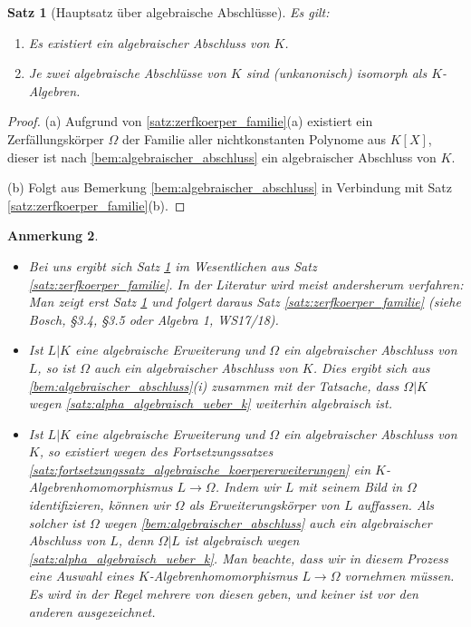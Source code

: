 \documentclass[a4paper, twoside, 11pt, ngerman]{report}
\theoremstyle{definistyle}
\newtheorem{satz}{Satz}[section]
\newtheorem{anm}[satz]{Anmerkung}
\theoremstyle{remark}
\begin{document}
\begin{satz}[Hauptsatz über algebraische Abschlüsse]\label{satz:hauptsatz_alg_abschluesse}
Es gilt:
\begin{enumerate}[label=(\alph*)]
\item Es existiert ein algebraischer Abschluss von $K$.
\item Je zwei algebraische Abschlüsse von $K$ sind (unkanonisch) isomorph als $K$-Algebren.
\end{enumerate}
\end{satz}

\begin{proof}
(a) Aufgrund von \ref{satz:zerfkoerper_familie}(a) existiert ein Zerfällungskörper $\Omega$ der Familie aller nichtkonstanten Polynome aus $K[X]$, dieser ist nach \ref{bem:algebraischer_abschluss} ein algebraischer Abschluss von $K$.

(b) Folgt aus Bemerkung \ref{bem:algebraischer_abschluss} in Verbindung mit Satz \ref{satz:zerfkoerper_familie}(b).
\end{proof}

\begin{anm}\label{anm:einbettung_alg_abschluss}
\begin{itemize}
\item Bei uns ergibt sich Satz \ref{satz:hauptsatz_alg_abschluesse} im Wesentlichen aus Satz \ref{satz:zerfkoerper_familie}. In der Literatur wird meist andersherum verfahren: Man zeigt erst Satz \ref{satz:hauptsatz_alg_abschluesse} und folgert daraus Satz \ref{satz:zerfkoerper_familie} (siehe Bosch, §3.4, §3.5 oder Algebra 1, WS17/18).
\item Ist $L|K$ eine algebraische Erweiterung und $\Omega$ ein algebraischer Abschluss von $L$, so ist $\Omega$ auch ein algebraischer Abschluss von $K$. Dies ergibt sich aus \ref{bem:algebraischer_abschluss}(i) zusammen mit der Tatsache, dass $\Omega|K$ wegen \ref{satz:alpha_algebraisch_ueber_k} weiterhin algebraisch ist. 
\item Ist $L|K$ eine algebraische Erweiterung und $\Omega$ ein algebraischer Abschluss von $K$, so existiert wegen des Fortsetzungssatzes \ref{satz:fortsetzungssatz_algebraische_koerpererweiterungen} ein $K$-Algebrenhomomorphismus
$L\to\Omega$. Indem wir $L$ mit seinem Bild in $\Omega$ identifizieren, können wir
$\Omega$ als Erweiterungskörper von $L$ auffassen. Als solcher ist $\Omega$ wegen \ref{bem:algebraischer_abschluss} auch ein algebraischer Abschluss von $L$, denn $\Omega|L$ ist algebraisch wegen \ref{satz:alpha_algebraisch_ueber_k}. Man beachte, dass wir in diesem Prozess eine Auswahl eines $K$-Algebrenhomomorphismus $L\to\Omega$ vornehmen müssen. 
Es wird in der Regel mehrere von diesen geben, und keiner ist vor den anderen ausgezeichnet.
\end{itemize}
\end{anm}
\end{document}
